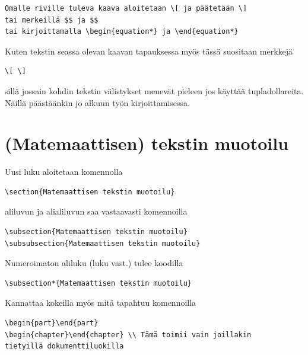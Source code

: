 \documentclass[a4paper,12 pt]{article}
\theoremstyle{plain}
\theoremstyle{definition}
\theoremstyle{remark}
\numberwithin{equation}{section}
\numberwithin{figure}{section}
\begin{document}
\begin{verbatim}
Omalle riville tuleva kaava aloitetaan \[ ja päätetään \]
tai merkeillä $$ ja $$ 
tai kirjoittamalla \begin{equation*} ja \end{equation*}
\end{verbatim}
Kuten tekstin seassa olevan kaavan tapauksessa myös tässä suositaan merkkejä

\begin{verbatim}
\[ \]
\end{verbatim}
sillä jossain kohdin tekstin välistykset menevät pieleen jos käyttää tupladollareita. Näillä päästäänkin jo alkuun työn kirjoittamisessa.

\newpage
\section{(Matemaattisen) tekstin muotoilu}
Uusi luku aloitetaan komennolla

\begin{verbatim}
\section{Matemaattisen tekstin muotoilu}
\end{verbatim}
aliluvun ja alialiluvun saa vastaavasti komennoilla

\begin{verbatim}
\subsection{Matemaattisen tekstin muotoilu}
\subsubsection{Matemaattisen tekstin muotoilu}
\end{verbatim}
Numeroimaton aliluku (luku vast.) tulee koodilla

\begin{verbatim}
\subsection*{Matemaattisen tekstin muotoilu}
\end{verbatim}
Kannattaa kokeilla myös mitä tapahtuu komennoilla 

\begin{verbatim}
\begin{part}\end{part}
\begin{chapter}\end{chapter} \\ Tämä toimii vain joillakin 
tietyillä dokumenttiluokilla
\end{verbatim}
\end{document}
